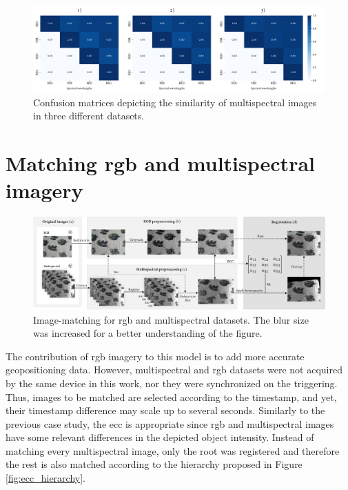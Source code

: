\begin{figure}
    \centering
    \includegraphics{figs/image_fusion/confusion_matrices.png}
    \caption{Confusion matrices depicting the similarity of multispectral images in three different datasets.}
    \label{fig:multi_band_correlation}
\end{figure}

\section{Matching \acrshort{rgb} and multispectral imagery}

\begin{figure}
    \centering
    \includegraphics{figs/image_fusion/multispectral_rgb_registration.png}
    \caption{Image-matching for \acrshort{rgb} and multispectral datasets. The blur size was increased for a better understanding of the figure.}
    \label{fig:rgb_multi_registration}
\end{figure}

The contribution of \acrshort{rgb} imagery to this model is to add more accurate geopositioning data. However, multispectral and \acrshort{rgb} datasets were not acquired by the same device in this work, nor they were synchronized on the triggering. Thus, images to be matched are selected according to the timestamp, and yet, their timestamp difference may scale up to several seconds. Similarly to the previous case study, the \acrshort{ecc} is appropriate since \acrshort{rgb} and multispectral images have some relevant differences in the depicted object intensity. Instead of matching every multispectral image, only the root was registered and therefore the rest is also matched according to the hierarchy proposed in Figure \ref{fig:ecc_hierarchy}.

